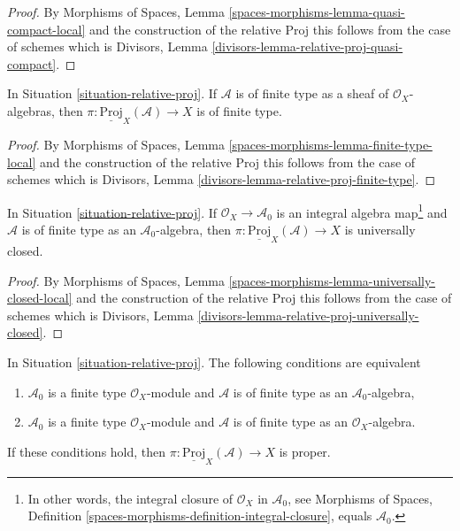 \begin{proof}
By Morphisms of Spaces, Lemma \ref{spaces-morphisms-lemma-quasi-compact-local}
and the construction of the relative Proj this follows from the
case of schemes which is
Divisors, Lemma \ref{divisors-lemma-relative-proj-quasi-compact}.
\end{proof}

\begin{lemma}
\label{lemma-relative-proj-finite-type}
In Situation \ref{situation-relative-proj}.
If $\mathcal{A}$ is of finite type as a sheaf of
$\mathcal{O}_X$-algebras, then
$\pi : \underline{\text{Proj}}_X(\mathcal{A}) \to X$ is of finite type.
\end{lemma}

\begin{proof}
By Morphisms of Spaces, Lemma \ref{spaces-morphisms-lemma-finite-type-local}
and the construction of the relative Proj this follows from the
case of schemes which is
Divisors, Lemma \ref{divisors-lemma-relative-proj-finite-type}.
\end{proof}

\begin{lemma}
\label{lemma-relative-proj-universally-closed}
In Situation \ref{situation-relative-proj}. If
$\mathcal{O}_X \to \mathcal{A}_0$
is an integral algebra map\footnote{In other words, the integral
closure of $\mathcal{O}_X$ in $\mathcal{A}_0$, see
Morphisms of Spaces, Definition
\ref{spaces-morphisms-definition-integral-closure}, equals
$\mathcal{A}_0$.} and $\mathcal{A}$ is of finite type as an
$\mathcal{A}_0$-algebra, then
$\pi : \underline{\text{Proj}}_X(\mathcal{A}) \to X$ is universally closed.
\end{lemma}

\begin{proof}
By Morphisms of Spaces, Lemma
\ref{spaces-morphisms-lemma-universally-closed-local}
and the construction of the relative Proj this follows from the
case of schemes which is
Divisors, Lemma \ref{divisors-lemma-relative-proj-universally-closed}.
\end{proof}

\begin{lemma}
\label{lemma-relative-proj-proper}
In Situation \ref{situation-relative-proj}.
The following conditions are equivalent
\begin{enumerate}
\item $\mathcal{A}_0$ is a finite type $\mathcal{O}_X$-module
and $\mathcal{A}$ is of finite type as an $\mathcal{A}_0$-algebra,
\item $\mathcal{A}_0$ is a finite type $\mathcal{O}_X$-module 
and $\mathcal{A}$ is of finite type as an $\mathcal{O}_X$-algebra.
\end{enumerate}
If these conditions hold, then
$\pi : \underline{\text{Proj}}_X(\mathcal{A}) \to X$
is proper.
\end{lemma}

